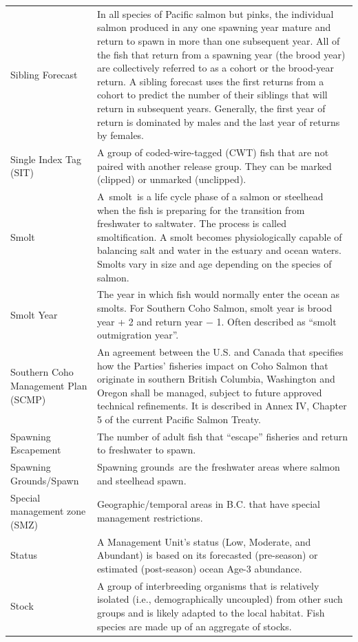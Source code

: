 \documentclass[
  letterpaper,
  DIV=11,
  numbers=noendperiod]{scrartcl}
\begin{document}
\begin{table}
\begin{tabular*}{\linewidth}{@{\extracolsep{\fill}}ll}
Sibling Forecast & In all species of Pacific salmon but pinks, the individual salmon produced in any one spawning year mature and return to spawn in more than one subsequent year. All of the fish that return from a spawning year (the brood year) are collectively referred to as a cohort or the brood-year return. A sibling forecast uses the first returns from a cohort to predict the number of their siblings that will return in subsequent years. Generally, the first year of return is dominated by males and the last year of returns by females. \\ 
Single Index Tag (SIT) & A group of coded-wire-tagged (CWT) fish that are not paired with another release group. They can be marked (clipped) or unmarked (unclipped). \\ 
Smolt & A smolt is a life cycle phase of a salmon or steelhead when the fish is preparing for the transition from freshwater to saltwater. The process is called smoltification. A smolt becomes physiologically capable of balancing salt and water in the estuary and ocean waters. Smolts vary in size and age depending on the species of salmon. \\ 
Smolt Year & The year in which fish would normally enter the ocean as smolts.  For Southern Coho Salmon, smolt year is brood year + 2 and return year − 1.  Often described as “smolt outmigration year”. \\ 
Southern Coho Management Plan (SCMP) & An agreement between the U.S. and Canada that specifies how the Parties’ fisheries impact on Coho Salmon that originate in southern British Columbia, Washington and Oregon shall be managed, subject to future approved technical refinements. It is described in Annex IV, Chapter 5 of the current Pacific Salmon Treaty. \\ 
Spawning Escapement & The number of adult fish that “escape” fisheries and return to freshwater to spawn. \\ 
Spawning Grounds/Spawn & Spawning grounds are the freshwater areas where salmon and steelhead spawn. \\ 
Special management zone (SMZ) & Geographic/temporal areas in B.C. that have special management restrictions. \\ 
Status & A Management Unit's status (Low, Moderate, and Abundant) is based on its forecasted (pre-season) or estimated (post-season) ocean Age-3 abundance. \\ 
Stock & A group of interbreeding organisms that is relatively isolated (i.e., demographically uncoupled) from other such groups and is likely adapted to the local habitat. Fish species are made up of an aggregate of stocks. \\ 

\end{tabular*}
\end{table}
\end{document}
